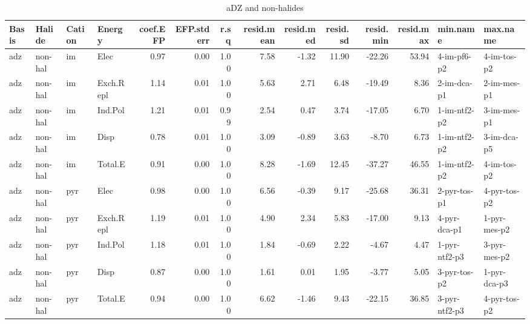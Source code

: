 \documentclass[a4paper]{article}
\begin{document}
\begin{landscape}
\begin{table}[ht]
\centering
\begin{tabular}{llllrrrrrrrrll}
  \hline
Basis & Halide & Cation & Energy & coef.EFP & EFP.stderr & r.sq & resid.mean & resid.med & resid.sd & resid.min & resid.max & min.name & max.name \\ 
  \hline
adz & non-hal & im & Elec & 0.97 & 0.00 & 1.00 & 7.58 & -1.32 & 11.90 & -22.26 & 53.94 & 4-im-pf6-p2 & 4-im-tos-p2 \\ 
  adz & non-hal & im & Exch.Repl & 1.14 & 0.01 & 1.00 & 5.63 & 2.71 & 6.48 & -19.49 & 8.36 & 2-im-dca-p1 & 2-im-mes-p1 \\ 
  adz & non-hal & im & Ind.Pol & 1.21 & 0.01 & 0.99 & 2.54 & 0.47 & 3.74 & -17.05 & 6.70 & 1-im-ntf2-p2 & 3-im-mes-p1 \\ 
  adz & non-hal & im & Disp & 0.78 & 0.01 & 1.00 & 3.09 & -0.89 & 3.63 & -8.70 & 6.73 & 1-im-ntf2-p2 & 3-im-dca-p5 \\ 
  adz & non-hal & im & Total.E & 0.91 & 0.00 & 1.00 & 8.28 & -1.69 & 12.45 & -37.27 & 46.55 & 1-im-ntf2-p2 & 4-im-tos-p2 \\ 
  adz & non-hal & pyr & Elec & 0.98 & 0.00 & 1.00 & 6.56 & -0.39 & 9.17 & -25.68 & 36.31 & 2-pyr-tos-p1 & 4-pyr-tos-p2 \\ 
  adz & non-hal & pyr & Exch.Repl & 1.19 & 0.01 & 1.00 & 4.90 & 2.34 & 5.83 & -17.00 & 9.13 & 4-pyr-dca-p1 & 1-pyr-mes-p2 \\ 
  adz & non-hal & pyr & Ind.Pol & 1.18 & 0.01 & 1.00 & 1.84 & -0.69 & 2.22 & -4.67 & 4.47 & 1-pyr-ntf2-p3 & 3-pyr-mes-p2 \\ 
  adz & non-hal & pyr & Disp & 0.87 & 0.00 & 1.00 & 1.61 & 0.01 & 1.95 & -3.77 & 5.05 & 3-pyr-tos-p2 & 1-pyr-dca-p3 \\ 
  adz & non-hal & pyr & Total.E & 0.94 & 0.00 & 1.00 & 6.62 & -1.46 & 9.43 & -22.15 & 36.85 & 3-pyr-ntf2-p3 & 4-pyr-tos-p2 \\ 
   \hline
\end{tabular}
\caption{aDZ and non-halides}
\end{table}



\end{landscape}
\end{document}
